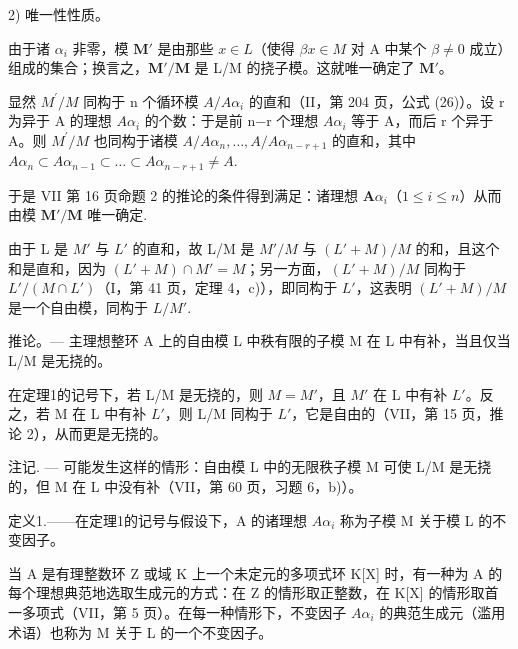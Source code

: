 2) 唯一性性质。

由于诸 \(\alpha_{i}\) 非零，模 \(\mathbf{M}'\) 是由那些 \(x\in L\)（使得 \(\beta x\in M\) 对 A 中某个 \(\beta \neq 0\) 成立）组成的集合；换言之，\(\mathbf{M}' / \mathbf{M}\) 是 L/M 的挠子模。这就唯一确定了 \(\mathbf{M}'\)。

显然 \(M^{\prime}/M\) 同构于 n 个循环模 \(A/A\alpha_{i}\) 的直和（II，第 204 页，公式 (26)）。设 r 为异于 A 的理想 \(A\alpha_{i}\) 的个数：于是前 n−r 个理想 \(A\alpha_{i}\) 等于 A，而后 r 个异于 A。则 \(M^{\prime}/M\) 也同构于诸模 \(A/A\alpha_{n}, \ldots, A/A\alpha_{n-r+1}\) 的直和，其中 \(A\alpha_{n} \subset A\alpha_{n-1} \subset \ldots \subset A\alpha_{n-r+1} \neq A\).

于是 VII 第 16 页命题 2 的推论的条件得到满足：诸理想 \(\mathbf{A}\alpha_{i}\)（\(1 \leqslant i \leqslant n\)）从而由模 \(\mathbf{M}'/\mathbf{M}\) 唯一确定.

由于 L 是 \(M'\) 与 \(L'\) 的直和，故 L/M 是 \(M'/M\) 与 \((L'+M)/M\) 的和，且这个和是直和，因为 \((L'+M) \cap M' = M\)；另一方面，\((L'+M)/M\) 同构于 \(L'/(M \cap L')\)（I，第 41 页，定理 4，c)），即同构于 \(L'\)，这表明 \((L'+M)/M\) 是一个自由模，同构于 \(L/M'\).

推论。--- 主理想整环 A 上的自由模 L 中秩有限的子模 M 在 L 中有补，当且仅当 L/M 是无挠的。

在定理1的记号下，若 L/M 是无挠的，则 \(M = M'\)，且 \(M'\) 在 L 中有补 \(L'\)。反之，若 M 在 L 中有补 \(L'\)，则 L/M 同构于 \(L'\)，它是自由的（VII，第 15 页，推论 2），从而更是无挠的。

注记. --- 可能发生这样的情形：自由模 L 中的无限秩子模 M 可使 L/M 是无挠的，但 M 在 L 中没有补（VII，第 60 页，习题 6，b)）。

定义1.——在定理1的记号与假设下，A 的诸理想 \(A\alpha_{i}\) 称为子模 M 关于模 L 的不变因子。

当 A 是有理整数环 Z 或域 K 上一个未定元的多项式环 K{[}X{]} 时，有一种为 A 的每个理想典范地选取生成元的方式：在 Z 的情形取正整数，在 K{[}X{]} 的情形取首一多项式（VII，第 5 页）。在每一种情形下，不变因子 \(A\alpha_{i}\) 的典范生成元（滥用术语）也称为 M 关于 L 的一个不变因子。

